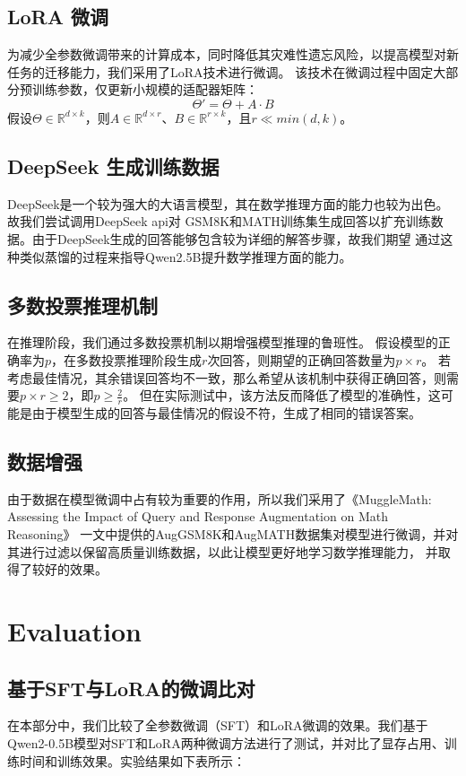 \documentclass{article}
\begin{document}
\subsection{LoRA 微调}
为减少全参数微调带来的计算成本，同时降低其灾难性遗忘风险，以提高模型对新任务的迁移能力，我们采用了LoRA技术进行微调。
该技术在微调过程中固定大部分预训练参数，仅更新小规模的适配器矩阵：
$$
\Theta' = \Theta + A \cdot B
$$
假设$\Theta \in \mathbb{R}^{d \times k}$，则$A \in \mathbb{R}^{d \times r}$、$B \in \mathbb{R}^{r \times k}$，且$r \ll min(d, k)$。

\subsection{DeepSeek 生成训练数据}
DeepSeek是一个较为强大的大语言模型，其在数学推理方面的能力也较为出色。故我们尝试调用DeepSeek api对
GSM8K和MATH训练集生成回答以扩充训练数据。由于DeepSeek生成的回答能够包含较为详细的解答步骤，故我们期望
通过这种类似蒸馏的过程来指导Qwen2.5B提升数学推理方面的能力。

\subsection{多数投票推理机制}
在推理阶段，我们通过多数投票机制以期增强模型推理的鲁班性。
假设模型的正确率为$p$，在多数投票推理阶段生成$r$次回答，则期望的正确回答数量为$p \times r$。
若考虑最佳情况，其余错误回答均不一致，那么希望从该机制中获得正确回答，则需要$p \times r \ge 2$，即$p \ge \frac{2}{r}$。
但在实际测试中，该方法反而降低了模型的准确性，这可能是由于模型生成的回答与最佳情况的假设不符，生成了相同的错误答案。

\subsection{数据增强}
由于数据在模型微调中占有较为重要的作用，所以我们采用了《MuggleMath: Assessing the Impact of Query and Response Augmentation on Math Reasoning》
一文中提供的AugGSM8K和AugMATH数据集对模型进行微调，并对其进行过滤以保留高质量训练数据，以此让模型更好地学习数学推理能力，
并取得了较好的效果。




\section{Evaluation}

\subsection{基于SFT与LoRA的微调比对}
在本部分中，我们比较了全参数微调（SFT）和LoRA微调的效果。我们基于Qwen2-0.5B模型对SFT和LoRA两种微调方法进行了测试，并对比了显存占用、训练时间和训练效果。实验结果如下表所示：
\end{document}
